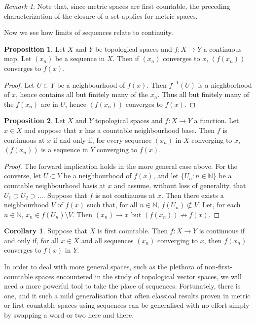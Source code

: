\documentclass{book}
\theoremstyle{definition}
\newtheorem{proposition}{Proposition}[section]
\newtheorem{corollary}{Corollary}[theorem]
\theoremstyle{remark}
\newtheorem{remark}{Remark}[section]
\newcommand{\N}{\mathbb{N}}
\begin{document}
\begin{remark}
Note that, since metric spaces are first countable, the preceding characterization of the closure of a set applies for metric spaces.
\end{remark}

Now we see how limits of sequences relate to continuity.
\begin{proposition}
Let $X$ and $Y$ be topological spaces and $f:X\to Y$ a continuous map. Let $(x_n)$ be a sequence in $X$. Then if $(x_n)$ converges to $x$, $(f(x_n))$ converges to $f(x)$.
\end{proposition}
\begin{proof}
Let $U\subset Y$ be a neighbourhood of $f(x)$. Then $f^{-1}(U)$ is a nieghborhood of $x$, hence contains all but finitely many of the $x_n$. Thus all but finitely many of the $f(x_n)$ are in $U$, hence $(f(x_n))$ converges to $f(x)$.
\end{proof}

\begin{proposition}
Let $X$ and $Y$ topological spaces and $f:X\to Y$ a function. Let $x\in X$ and suppose that $x$ has a countable neighbourhood base. Then $f$ is continuous at $x$ if and only if, for every sequence $(x_n)$ in $X$ converging to $x$, $(f(x_n))$ is a sequence in $Y$ converging to $f(x)$.
\end{proposition}
\begin{proof}
The forward implication holds in the more general case above. For the converse, let $U\subset Y$ be a neighbourhood of $f(x)$, and let $\{U_n:n\in\N\}$ be a countable neighbourhood basis at $x$ and assume, without loss of generality, that $U_1\supset U_2\supset\hdots$. Suppose that $f$ is not continuous at $x$. Then there exists a neighbourhood $V$ of $f(x)$ such that, for all $n\in\N$, $f(U_n)\not\subset V$. Let, for each $n\in\N$, $x_n\in f(U_n)\setminus V$. Then $(x_n)\to x$ but $(f(x_n))\not\to f(x)$.
\end{proof}
\begin{corollary}
Suppose that $X$ is first countable. Then $f:X\to Y$ is continuous if and only if, for all $x\in X$ and all sequences $(x_n)$ converging to $x$, then $f(x_n)$ converges to $f(x)$ in $Y$.
\end{corollary}

In order to deal with more general spaces, such as the plethora of non-first-countable spaces encountered in the study of topological vector spaces, we will need a more powerful tool to take the place of sequences. Fortunately, there is one, and it such a mild generalisation that often classical results proven in metric or first countable spaces using sequences can be generalised with no effort simply by swapping a word or two here and there.
\end{document}
